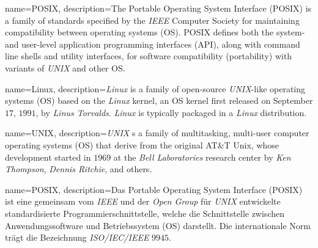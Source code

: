 	

\fi

\ifenglish%
	{%
		name={POSIX},
		description={The Portable Operating System Interface (POSIX) is a family of standards specified by the \textit{IEEE} Computer Society for maintaining compatibility between operating systems (OS). POSIX defines both the system- and user-level application programming interfaces (API), along with command line shells and utility interfaces, for software compatibility (portability) with variants of \textit{UNIX} and other OS.}
	}

	{%
		name={Linux},
		description={\textit{Linux} is a family of open-source \textit{UNIX}-like operating systems (OS) based on the \textit{Linux} kernel, an OS kernel first released on September $17$, $1991$, by \textit{Linus Torvalds}. \textit{Linux} is typically packaged in a \textit{Linux} distribution.}
	}

	{%
		name={UNIX},
		description={\textit{UNIX} s a family of multitasking, multi-user computer operating systems (OS) that derive from the original AT&T Unix, whose development started in $1969$ at the \textit{Bell Laboratories} research center by \textit{Ken Thompson}, \textit{Dennis Ritchie}, and others.}
	}

\else

	{%
		name={POSIX},
		description={Das Portable Operating System Interface (POSIX) ist eine gemeinsam vom \textit{IEEE} und der \textit{Open Group} für \textit{UNIX} entwickelte standardisierte Programmierschnittstelle, welche die Schnittstelle zwischen Anwendungssoftware und Betriebssystem (OS) darstellt. Die internationale Norm trägt die Bezeichnung \textit{ISO/IEC/IEEE} $9945$.}
	}

